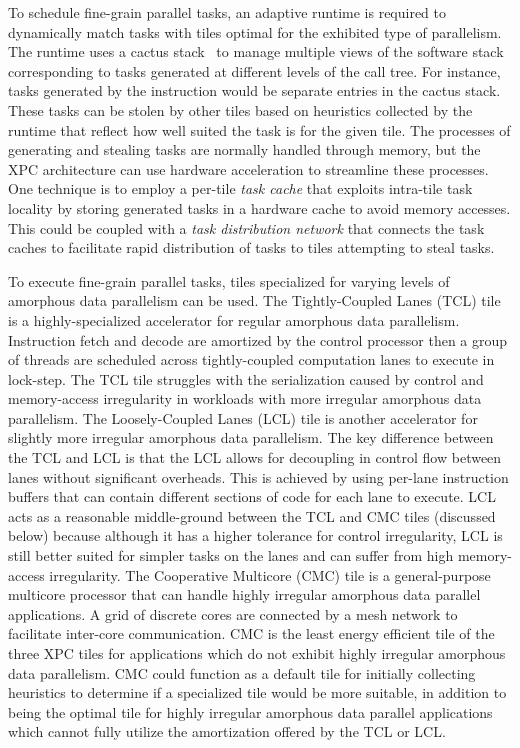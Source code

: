 To schedule fine-grain parallel tasks, an adaptive runtime is required to
dynamically match tasks with tiles optimal for the exhibited type of
parallelism. The runtime uses a cactus
stack~\cite{frigo-hyperobjects-spaa2009} to manage multiple views of the
software stack corresponding to tasks generated at different levels of
the call tree. For instance, tasks generated by the 
instruction would be separate entries in the cactus stack. These tasks
can be stolen by other tiles based on heuristics collected by the runtime
that reflect how well suited the task is for the given tile. The processes
of generating and stealing tasks are normally handled through memory, but
the XPC architecture can use hardware acceleration to streamline these
processes. One technique is to employ a per-tile \emph{task cache} that
exploits intra-tile task locality by storing generated tasks in a
hardware cache to avoid memory accesses. This could be coupled with
a \emph{task distribution network} that connects the task caches to
facilitate rapid distribution of tasks to tiles attempting to steal
tasks.

To execute fine-grain parallel tasks, tiles specialized for varying
levels of amorphous data parallelism can be used. The Tightly-Coupled
Lanes (TCL) tile is a
highly-specialized accelerator for regular amorphous data
parallelism. Instruction fetch and decode are amortized by the control
processor then a group of threads are scheduled across tightly-coupled
computation lanes to execute in lock-step. The TCL tile struggles with
the serialization caused by control and memory-access irregularity in
workloads with more irregular amorphous data parallelism.
The Loosely-Coupled Lanes (LCL) tile is another accelerator for slightly more
irregular amorphous data parallelism. The key difference between the TCL
and LCL is that the LCL allows for decoupling in control flow between
lanes without significant overheads. This is achieved by using per-lane
instruction buffers that can contain different sections of code for each
lane to execute. LCL acts as a reasonable middle-ground between the TCL
and CMC tiles (discussed below) because although it has a higher
tolerance for control irregularity, LCL is still better suited for
simpler tasks on the lanes and can suffer from high memory-access
irregularity. The Cooperative Multicore (CMC) tile is a general-purpose
multicore processor that can handle highly irregular amorphous data
parallel applications. A grid of discrete cores are connected by a mesh
network to facilitate inter-core communication. CMC is the least energy
efficient tile of the three XPC tiles for applications which do not
exhibit highly irregular amorphous data parallelism. CMC could function
as a default tile for initially collecting heuristics to determine if a
specialized tile would be more suitable, in addition to being the optimal
tile for highly irregular amorphous data parallel applications which
cannot fully utilize the amortization offered by the TCL or LCL.

